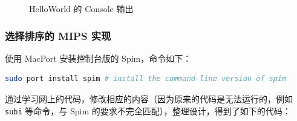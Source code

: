 \documentclass[11pt]{SEU-Digital-Report}
\begin{document}
      \begin{figure}[htbp]
        \centering
        \caption{HelloWorld 的 Console 输出}
        \label{fig:qtspim_console}
      \end{figure}

      \subsubsection{选择排序的 MIPS 实现}

      使用 MacPort 安装控制台版的 Spim，命令如下：

      \begin{lstlisting}[language=sh,title={Install Spim on MacOS with MacPort}]
sudo port install spim # install the command-line version of spim
      \end{lstlisting}

      通过学习网上的代码，修改相应的内容（因为原来的代码是无法运行的，例如 \texttt{subi} 等命令，与 Spim 的要求不完全匹配），整理设计，得到了如下的代码：
\end{document}

